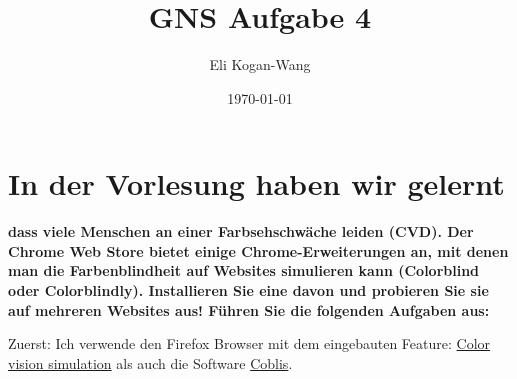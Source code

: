 \documentclass[a4paper,12pt]{article}
\title{GNS Aufgabe 4}
\author{Eli Kogan-Wang}
\date{\today}
\begin{document}
\section{In der Vorlesung haben wir gelernt}

\textbf{dass viele Menschen an einer Farbsehschwäche
  leiden (CVD). Der Chrome Web Store bietet einige Chrome-Erweiterungen an, mit
  denen man die Farbenblindheit auf Websites simulieren kann (Colorblind oder
  Colorblindly). Installieren Sie eine davon und probieren Sie sie auf mehreren Websites
  aus! Führen Sie die folgenden Aufgaben aus:}

Zuerst: Ich verwende den Firefox Browser mit dem eingebauten Feature:
\href{https://firefox-source-docs.mozilla.org/devtools-user/accessibility_inspector/simulation/index.html}{Color vision simulation}
als auch die Software \href{https://www.color-blindness.com/coblis-color-blindness-simulator/}{Coblis}.
\end{document}
